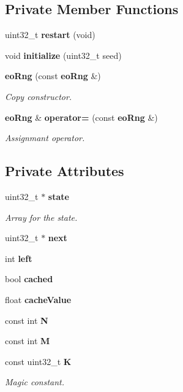 \subsection*{Private Member Functions}
\begin{CompactItemize}
\item 
uint32\_\-t {\bf restart} (void)\label{classeo_rng_d0}

\item 
void {\bf initialize} (uint32\_\-t seed)\label{classeo_rng_d1}

\item 
{\bf eo\-Rng} (const {\bf eo\-Rng} \&)
\begin{CompactList}\small\item\em Copy constructor. \item\end{CompactList}\item 
{\bf eo\-Rng} \& {\bf operator=} (const {\bf eo\-Rng} \&)
\begin{CompactList}\small\item\em Assignmant operator. \item\end{CompactList}\end{CompactItemize}
\subsection*{Private Attributes}
\begin{CompactItemize}
\item 
uint32\_\-t $\ast$ {\bf state}\label{classeo_rng_r0}

\begin{CompactList}\small\item\em Array for the state. \item\end{CompactList}\item 
uint32\_\-t $\ast$ {\bf next}\label{classeo_rng_r1}

\item 
int {\bf left}\label{classeo_rng_r2}

\item 
bool {\bf cached}\label{classeo_rng_r3}

\item 
float {\bf cache\-Value}\label{classeo_rng_r4}

\item 
const int {\bf N}\label{classeo_rng_r5}

\item 
const int {\bf M}\label{classeo_rng_r6}

\item 
const uint32\_\-t {\bf K}\label{classeo_rng_r7}

\begin{CompactList}\small\item\em Magic constant. \item\end{CompactList}\end{CompactItemize}


